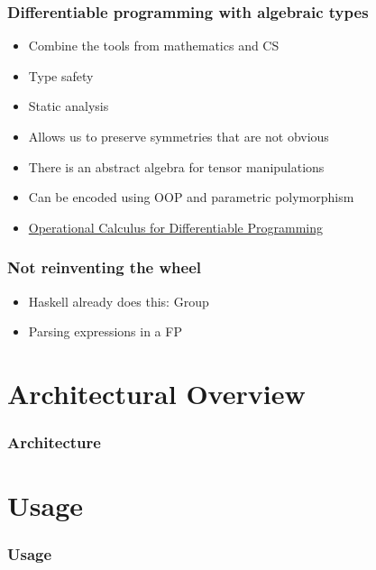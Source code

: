 \documentclass{beamer}
\begin{document}
    \begin{frame}
        \frametitle{Differentiable programming with algebraic types}
        \begin{itemize}
            \item Combine the tools from mathematics and CS
            \item Type safety
            \item Static analysis
            \item Allows us to preserve symmetries that are not obvious
            \item There is an abstract algebra for tensor manipulations
            \item Can be encoded using OOP and parametric polymorphism
            \item \href{https://arxiv.org/pdf/1610.07690.pdf}{Operational Calculus for Differentiable Programming}
        \end{itemize}
    \end{frame}



    \begin{frame}
        \frametitle{Not reinventing the wheel}
        \begin{itemize}
            \item Haskell already does this: Group
            \item Parsing expressions in a FP
        \end{itemize}
    \end{frame}


    \section{Architectural Overview}\label{sec:third-section}

    \begin{frame}
        \frametitle{Architecture}
    \end{frame}

    \section{Usage}\label{sec:fourth-section}

    \begin{frame}
        \frametitle{Usage}
    \end{frame}
\end{document}
